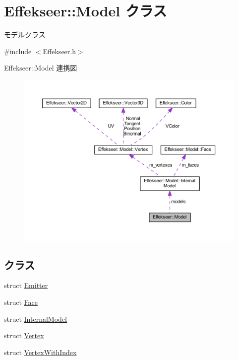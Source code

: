 \hypertarget{class_effekseer_1_1_model}{}\section{Effekseer\+:\+:Model クラス}
\label{class_effekseer_1_1_model}


モデルクラス  




{\ttfamily \#include $<$Effekseer.\+h$>$}



Effekseer\+:\+:Model 連携図\nopagebreak
\begin{figure}[H]
\begin{center}
\leavevmode
\includegraphics[width=350pt]{class_effekseer_1_1_model__coll__graph}
\end{center}
\end{figure}
\subsection*{クラス}
\begin{DoxyCompactItemize}
\item 
struct \mbox{\hyperlink{struct_effekseer_1_1_model_1_1_emitter}{Emitter}}
\item 
struct \mbox{\hyperlink{struct_effekseer_1_1_model_1_1_face}{Face}}
\item 
struct \mbox{\hyperlink{struct_effekseer_1_1_model_1_1_internal_model}{Internal\+Model}}
\item 
struct \mbox{\hyperlink{struct_effekseer_1_1_model_1_1_vertex}{Vertex}}
\item 
struct \mbox{\hyperlink{struct_effekseer_1_1_model_1_1_vertex_with_index}{Vertex\+With\+Index}}
\end{DoxyCompactItemize}
